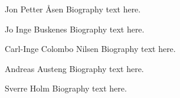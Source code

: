 \documentclass[journal]{IEEEtran}
\begin{document}
\newpage

\begin{IEEEbiography}{Jon Petter \AA{}sen}
Biography text here.
\end{IEEEbiography}

\begin{IEEEbiography}{Jo Inge Buskenes}
Biography text here.
\end{IEEEbiography}

\begin{IEEEbiography}{Carl-Inge Colombo Nilsen}
Biography text here.
\end{IEEEbiography}

\newpage

\begin{IEEEbiography}{Andreas Austeng}
Biography text here.
\end{IEEEbiography}

\begin{IEEEbiography}{Sverre Holm}
Biography text here.
\end{IEEEbiography}







\end{document}
